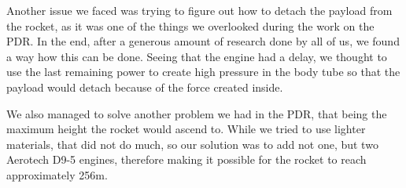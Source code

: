 Another issue we faced was trying to figure out how to detach the payload from the rocket, as it was one of the things we overlooked during the work on the PDR. In the end, after a generous amount of research done by all of us, we found a way how this can be done. Seeing that the engine had a delay, we thought to use the last remaining power to create high pressure in the body tube so that the payload would detach because of the force created inside.

We also managed to solve another problem we had in the PDR, that being the maximum height the rocket would ascend to. While we tried to use lighter materials, that did not do much, so our solution was to add not one, but two Aerotech D9-5 engines, therefore making it possible for the rocket to reach approximately 256m.
